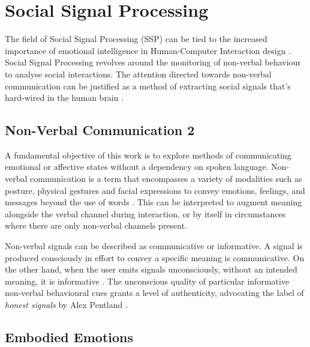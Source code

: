 \section{Social Signal Processing}

The field of Social Signal Processing (SSP) can be tied to the increased importance of emotional intelligence in Human-Computer Interaction design \cite{cristescu_emotions_2008}. Social Signal Processing revolves around the monitoring of non-verbal behaviour to analyse social interactions. The attention directed towards non-verbal communication can be justified as a method of extracting social signals that's hard-wired in the human brain \cite{vinciarelli_social_2009-1}. 

\subsection{Non-Verbal Communication 2}

A fundamental objective of this work is to explore methods of communicating emotional or affective states without a dependency on spoken language. Non-verbal communication is a term that encompasses a variety of modalities such as posture, physical gestures and facial expressions to convey emotions, feelings, and messages beyond the use of words \cite{knapp_nonverbal_2009, richmond_nonverbal_2011}. This can be interpreted to augment meaning alongside the verbal channel during interaction, or by itself in circumstances where there are only non-verbal channels present. 

Non-verbal signals can be described as communicative or informative. A signal is produced consciously in effort to convey a specific meaning is communicative. On the other hand, when the user emits signals unconsciously, without an intended meaning, it is informative \cite{vinciarelli_towards_2011}. The unconscious quality of particular informative non-verbal behavioural cues grants a level of authenticity, advocating the label of \textit{honest signals} by Alex Pentland \cite{pentland_honest_2010}.

\subsection{Embodied Emotions}

